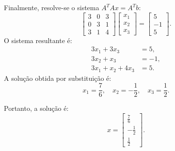 \begin{resolution}
\begin{enumerate}[label=\alph*)]
          Finalmente, resolve-se o sistema \( A^T A x = A^T b \):
          \[
            \begin{bmatrix}
              3 & 0 & 3 \\
              0 & 3 & 1 \\
              3 & 1 & 4
            \end{bmatrix}
            \begin{bmatrix}
              x_1 \\
              x_2 \\
              x_3
            \end{bmatrix} =
            \begin{bmatrix}
              5  \\
              -1 \\
              5
            \end{bmatrix}.
          \]
          O sistema resultante é:
          \[
            \begin{aligned}
              3x_1 + 3x_3       & = 5,  \\
              3x_2 + x_3        & = -1, \\
              3x_1 + x_2 + 4x_3 & = 5.
            \end{aligned}
          \]
          A solução obtida por substituição é:
          \[
            x_1 = \frac{7}{6}, \quad x_2 = -\frac{1}{2}, \quad x_3 = \frac{1}{2}.
          \]

          Portanto, a solução é:
          \[
            x = \begin{bmatrix}
              \frac{7}{6}  \\[8pt]
              -\frac{1}{2} \\[8pt]
              \frac{1}{2}
            \end{bmatrix}.
          \]

  \end{enumerate}
\end{resolution}

